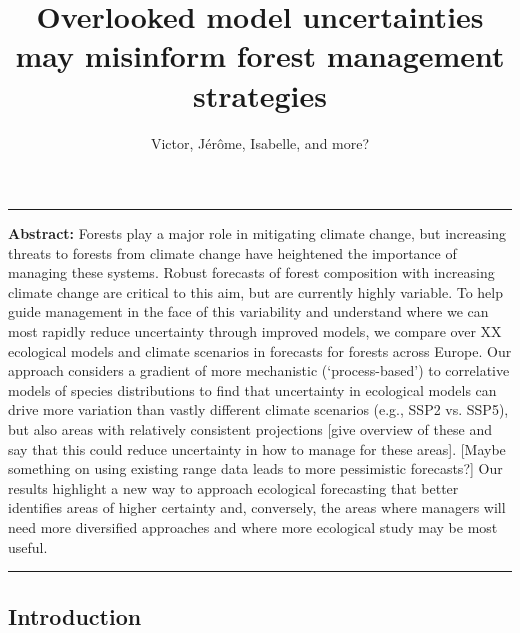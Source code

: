 \documentclass[11pt,letter]{article}
\begin{document}
\title{Overlooked model uncertainties may misinform forest management strategies}

\author{Victor, Jérôme, Isabelle, and more?}
\date{}
\maketitle 


\noindent\rule{\textwidth}{0.3pt}
\textbf{Abstract:} Forests play a major role in mitigating climate change, but increasing threats to forests from climate change have heightened the importance of managing these systems. Robust forecasts of forest composition with increasing climate change are critical to this aim, but are currently highly variable. To help guide management in the face of this variability and understand where we can most rapidly reduce uncertainty through improved models, we compare over XX ecological models and climate scenarios in forecasts for forests across Europe. Our approach considers a gradient of more mechanistic (`process-based') to correlative models of species distributions to find that uncertainty in ecological models can drive more variation than vastly different climate scenarios (e.g., SSP2 vs. SSP5), but also areas with relatively consistent projections [give overview of these and say that this could reduce uncertainty in how to manage for these areas]. [Maybe something on using existing range data leads to more pessimistic forecasts?] Our results highlight a new way to approach ecological forecasting that better identifies areas of higher certainty and, conversely, the areas where managers will need more diversified approaches and where more ecological study may be most useful. %

\noindent\rule{\textwidth}{0.3pt}

\vspace{0.3cm}

\linenumbers

\subsection*{Introduction}
%
\end{document}
